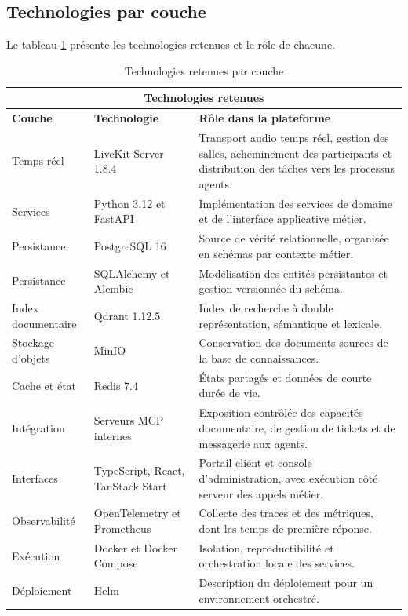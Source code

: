 \subsection{Technologies par couche}

Le tableau \ref{tab:techno} présente les technologies retenues et le rôle de chacune.

\begin{table}[H]
\centering
\renewcommand{\arraystretch}{1.2}
\begin{tabular}{|p{2.6cm}|p{4.0cm}|p{7.9cm}|}
\hline
\multicolumn{3}{|c|}{\textbf{Technologies retenues}} \\
\hline
\textbf{Couche} & \textbf{Technologie} & \textbf{Rôle dans la plateforme} \\
\hline
Temps réel & LiveKit Server 1.8.4 & Transport audio temps réel, gestion des salles, acheminement des participants et distribution des tâches vers les processus agents. \\
\hline
Services & Python 3.12 et FastAPI & Implémentation des services de domaine et de l'interface applicative métier. \\
\hline
Persistance & PostgreSQL 16 & Source de vérité relationnelle, organisée en schémas par contexte métier. \\
\hline
Persistance & SQLAlchemy et Alembic & Modélisation des entités persistantes et gestion versionnée du schéma. \\
\hline
Index documentaire & Qdrant 1.12.5 & Index de recherche à double représentation, sémantique et lexicale. \\
\hline
Stockage d'objets & MinIO & Conservation des documents sources de la base de connaissances. \\
\hline
Cache et état & Redis 7.4 & États partagés et données de courte durée de vie. \\
\hline
Intégration & Serveurs MCP internes & Exposition contrôlée des capacités documentaire, de gestion de tickets et de messagerie aux agents. \\
\hline
Interfaces & TypeScript, React, TanStack Start & Portail client et console d'administration, avec exécution côté serveur des appels métier. \\
\hline
Observabilité & OpenTelemetry et Prometheus & Collecte des traces et des métriques, dont les temps de première réponse. \\
\hline
Exécution & Docker et Docker Compose & Isolation, reproductibilité et orchestration locale des services. \\
\hline
Déploiement & Helm & Description du déploiement pour un environnement orchestré. \\
\hline
\end{tabular}
\caption{Technologies retenues par couche}
\label{tab:techno}
\end{table}

